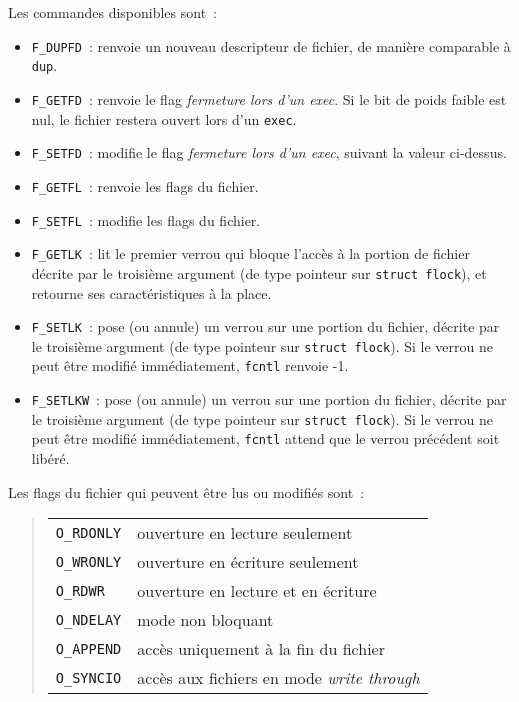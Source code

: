 \documentclass [twoside] {report}
\begin{document}
Les commandes disponibles sont~:

\begin {itemize}
    \item \texttt {F\_DUPFD}~: renvoie un nouveau descripteur de
	fichier, de manière comparable à \texttt {dup}.

    \item \texttt {F\_GETFD}~: renvoie le flag \textit {fermeture lors
	d'un exec}. Si le bit de poids faible est nul, le
	fichier restera ouvert lors d'un \texttt {exec}.

    \item \texttt {F\_SETFD}~: modifie le flag \textit {fermeture lors
	d'un exec}, suivant la valeur ci-dessus.

    \item \texttt {F\_GETFL}~: renvoie les flags du fichier.

    \item \texttt {F\_SETFL}~: modifie les flags du fichier.

    \item \texttt {F\_GETLK}~:  lit le premier verrou qui bloque l'accès à
	la portion de fichier décrite par le troisième argument (de type
	pointeur sur \texttt {struct flock}), et retourne ses
	caractéristiques à la place.

    \item \texttt {F\_SETLK}~:  pose (ou annule) un verrou sur une portion
	du fichier, décrite par le troisième argument (de type pointeur
	sur \texttt {struct flock}).  Si le verrou ne peut être modifié
	immédiatement, \texttt {fcntl} renvoie -1.

    \item \texttt {F\_SETLKW}~:  pose (ou annule) un verrou sur une portion
	du fichier, décrite par le troisième argument (de type pointeur
	sur \texttt {struct flock}).  Si le verrou ne peut être modifié
	immédiatement, \texttt {fcntl} attend que le verrou précédent soit
	libéré.

\end {itemize}


Les flags du fichier qui peuvent être lus ou modifiés sont~:

{\small
\begin {quote}
    \begin {tabular} {|ll|} \hline
	\texttt {O\_RDONLY} & ouverture en lecture seulement \\
	\texttt {O\_WRONLY} & ouverture en écriture seulement \\
	\texttt {O\_RDWR} & ouverture en lecture et en écriture \\
	\texttt {O\_NDELAY} & mode non bloquant \\
	\texttt {O\_APPEND} & accès uniquement à la fin du fichier \\
	\texttt {O\_SYNCIO} & accès aux fichiers en mode \emph {write through}
	    \\ \hline
    \end {tabular}
\end {quote}
}
\end{document}
